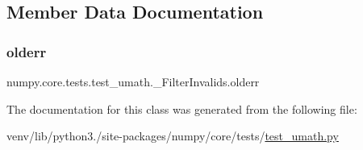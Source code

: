 \subsection{Member Data Documentation}
\mbox{\label{classnumpy_1_1core_1_1tests_1_1test__umath_1_1__FilterInvalids_ad2dc87df6c2144cf7b078b7834abcf03}} 
\subsubsection{\texorpdfstring{olderr}{olderr}}
{\footnotesize\ttfamily numpy.\+core.\+tests.\+test\+\_\+umath.\+\_\+\+Filter\+Invalids.\+olderr}



The documentation for this class was generated from the following file\+:\begin{DoxyCompactItemize}
\item 
venv/lib/python3./site-\/packages/numpy/core/tests/\hyperlink{test__umath_8py}{test\+\_\+umath.\+py}\end{DoxyCompactItemize}
